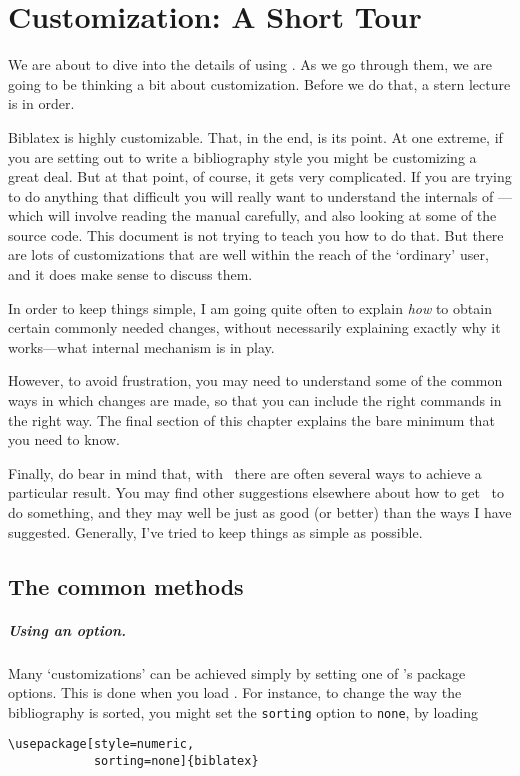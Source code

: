 \chapter{Customization: A Short Tour}\label{ch:customize1}

We are about to dive into the details of using \biblatex. As we go
through them, we are going to be thinking a bit about
customization. Before we do that, a stern lecture is in order.

\textsf{Biblatex} is highly customizable. That, in the end, is
its point. At one extreme, if you are setting out to write a
bibliography style you might be customizing a great deal. But at that
point, of course, it gets very complicated. If you are trying to do
anything that difficult you will really want to understand the
internals of \biblatex---which will involve reading the
manual carefully, and also looking at some of the source code. This
document is not trying to teach you how to do that. But there are lots
of customizations that are well within the reach of the `ordinary'
user, and it does make sense to discuss them.

In order to keep things simple, I am going quite often to
explain \emph{how} to obtain certain commonly needed changes, without
necessarily explaining exactly why it works---what internal mechanism
is in play.

However, to avoid frustration, you may need to understand some of the
common ways in which changes are made, so that you can include the
right commands in the right way. The final section of this chapter
explains the bare minimum that you need to know.

Finally, do bear in mind that, with \biblatex\ there are often several
ways to achieve a particular result. You may find other suggestions
elsewhere about how to get \biblatex\ to do something, and they may
well be just as good (or better) than the ways I have
suggested. Generally, I've tried to keep things as simple as possible.

\section{The common methods}

\paragraph{Using an option.} Many `customizations' can be achieved
simply by setting one of \biblatex's package options. This is done
when you load \biblatex. For instance, to change the way the
bibliography is sorted, you might set the \verb|sorting| option to
\verb|none|, by loading
\begin{verbatim}
\usepackage[style=numeric,
            sorting=none]{biblatex}
\end{verbatim}

